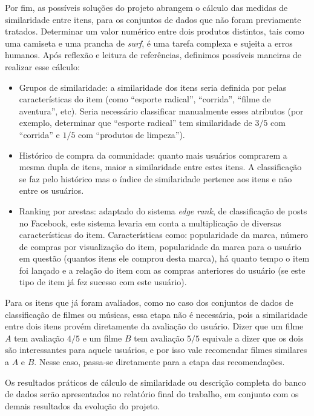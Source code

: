 Por fim, as possíveis soluções do projeto abrangem o cálculo das medidas de similaridade entre itens, para os conjuntos de dados que não foram previamente tratados. Determinar um valor numérico entre dois produtos distintos, tais como uma camiseta e uma prancha de \textit{surf}, é uma tarefa complexa e sujeita a erros humanos. Após reflexão e leitura de referências, definimos possíveis maneiras de realizar esse cálculo: 

\begin{itemize} 
	\item Grupos de similaridade: a similaridade dos itens seria definida por pelas características do item (como ``esporte radical'', ``corrida'', ``filme de aventura'', etc). Seria necessário classificar manualmente esses atributos (por exemplo, determinar que ``esporte radical'' tem similaridade de $3/5$ com ``corrida'' e $1/5$ com ``produtos de limpeza'').
	\item Histórico de compra da comunidade: quanto mais usuários comprarem a mesma dupla de itens, maior a similaridade entre estes itens. A classificação se faz pelo histórico mas o índice de similaridade pertence aos itens e não entre os usuários.
	\item Ranking por arestas: adaptado do sistema \textit{edge rank}, de classificação de posts no Facebook, este sistema levaria em conta a multiplicação de diversas características do item. Características como: popularidade da marca, número de compras por visualização do item, popularidade da marca para o usuário em questão (quantos itens ele comprou desta marca), há quanto tempo o item foi lançado e a relação do item com as compras anteriores do usuário (se este tipo de item já fez sucesso com este usuário).
\end{itemize}

Para os itens que já foram avaliados, como no caso dos conjuntos de dados de classificação de filmes ou músicas, essa etapa não é necessária, pois a similaridade entre dois itens provém diretamente da avaliação do usuário. Dizer que um filme $A$ tem avaliação $4/5$ e um filme $B$ tem avaliação $5/5$ equivale a dizer que os dois são interessantes para aquele usuários, e por isso vale recomendar filmes similares a $A$ e $B$. Nesse caso, passa-se  diretamente para a etapa das recomendações.

Os resultados práticos de cálculo de similaridade ou descrição completa do banco de dados serão apresentados no relatório final do trabalho, em conjunto com os demais resultados da evolução do projeto. 